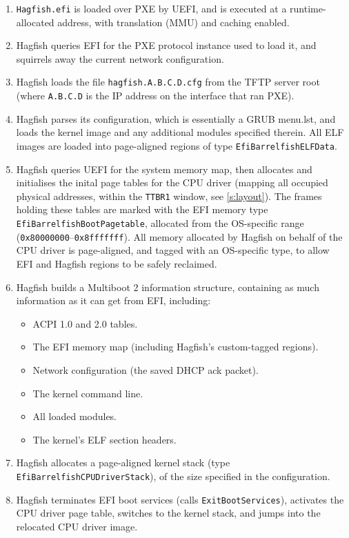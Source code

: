 \documentclass[a4paper,twoside]{report}
\begin{document}
\begin{enumerate}
\item \texttt{Hagfish.efi} is loaded over PXE by UEFI, and is executed at a
runtime-allocated address, with translation (MMU) and caching enabled.
\item Hagfish queries EFI for the PXE protocol instance used to load it, and
squirrels away the current network configuration.
\item Hagfish loads the file \texttt{hagfish.A.B.C.D.cfg} from the TFTP server
root (where \texttt{A.B.C.D} is the IP address on the interface that ran PXE).
\item Hagfish parses its configuration, which is essentially a GRUB menu.lst,
and loads the kernel image and any additional modules specified therein. All
ELF images are loaded into page-aligned regions of type
\texttt{EfiBarrelfishELFData}.
\item Hagfish queries UEFI for the system memory map, then allocates and
initialises the inital page tables for the CPU driver (mapping all occupied
physical addresses, within the \texttt{TTBR1} window, see \autoref{s:layout}).
The frames holding these tables are marked with the EFI memory type\\
\texttt{EfiBarrelfishBootPagetable}, allocated from the OS-specific range
(\texttt{0x80000000}--\texttt{0x8fffffff}). All memory allocated by Hagfish on
behalf of the CPU driver is page-aligned, and tagged with an OS-specific type,
to allow EFI and Hagfish regions to be safely reclaimed.
\item Hagfish builds a Multiboot 2 information structure, containing as much
information as it can get from EFI, including:
    \begin{itemize}
    \item ACPI 1.0 and 2.0 tables.
    \item The EFI memory map (including Hagfish's custom-tagged regions).
    \item Network configuration (the saved DHCP ack packet).
    \item The kernel command line.
    \item All loaded modules.
    \item The kernel's ELF section headers.
    \end{itemize}
\item Hagfish allocates a page-aligned kernel stack (type
\texttt{EfiBarrelfishCPUDriverStack}), of the size specified in the
configuration.
\item Hagfish terminates EFI boot services (calls \texttt{ExitBootServices}),
activates the CPU driver page table, switches to the kernel stack, and jumps
into the relocated CPU driver image.
\end{enumerate}
\end{document}
